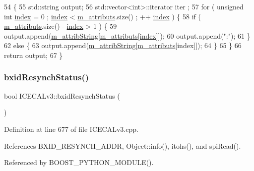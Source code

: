 \begin{DoxyCode}
54                             \{
55   std::string output;
56   std::vector<int>::iterator iter ;
57   \textcolor{keywordflow}{for} ( \textcolor{keywordtype}{unsigned} \textcolor{keywordtype}{int} \hyperlink{namespaceimages_a54407fd574970b3178647ae096321a57}{index} = 0 ; \hyperlink{namespaceimages_a54407fd574970b3178647ae096321a57}{index} < \hyperlink{classAttrib_ac4bd58a0cc6b38a3b711d609a3d3aacc}{m\_attributs}.size() ; ++
      \hyperlink{namespaceimages_a54407fd574970b3178647ae096321a57}{index} ) \{
58     \textcolor{keywordflow}{if} ( \hyperlink{classAttrib_ac4bd58a0cc6b38a3b711d609a3d3aacc}{m\_attributs}.size() - \hyperlink{namespaceimages_a54407fd574970b3178647ae096321a57}{index} > 1 ) \{
59       output.append(\hyperlink{classAttrib_a3414521d7a82476e874b25a5407b5e63}{m\_attribString}[\hyperlink{classAttrib_ac4bd58a0cc6b38a3b711d609a3d3aacc}{m\_attributs}[\hyperlink{namespaceimages_a54407fd574970b3178647ae096321a57}{index}]]);
60       output.append(\textcolor{stringliteral}{":"});
61     \}
62     \textcolor{keywordflow}{else} \{
63       output.append(\hyperlink{classAttrib_a3414521d7a82476e874b25a5407b5e63}{m\_attribString}[\hyperlink{classAttrib_ac4bd58a0cc6b38a3b711d609a3d3aacc}{m\_attributs}[index]]);
64     \}
65   \}
66   \textcolor{keywordflow}{return} output;
67 \}
\end{DoxyCode}
\mbox{\label{classICECALv3_a545f51b915a6de5c5f450622d0651a85}} 
\subsubsection{\texorpdfstring{bxid\+Resynch\+Status()}{bxidResynchStatus()}}
{\footnotesize\ttfamily bool I\+C\+E\+C\+A\+Lv3\+::bxid\+Resynch\+Status (\begin{DoxyParamCaption}{ }\end{DoxyParamCaption})}



Definition at line 677 of file I\+C\+E\+C\+A\+Lv3.\+cpp.



References B\+X\+I\+D\+\_\+\+R\+E\+S\+Y\+N\+C\+H\+\_\+\+A\+D\+DR, Object\+::info(), itohs(), and spi\+Read().



Referenced by B\+O\+O\+S\+T\+\_\+\+P\+Y\+T\+H\+O\+N\+\_\+\+M\+O\+D\+U\+L\+E().


